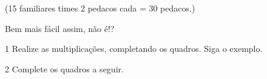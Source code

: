 \begin{escolha}
\begin{escolha}
{(15 familiares times 2 pedacos cada =  30 pedacos.)

Bem mais fácil assim, não é!?
}


\num{1} Realize as multiplicações, completando os quadros. Siga o exemplo.


\num{2} Complete os quadros a seguir.


\end{escolha}
\end{escolha}
